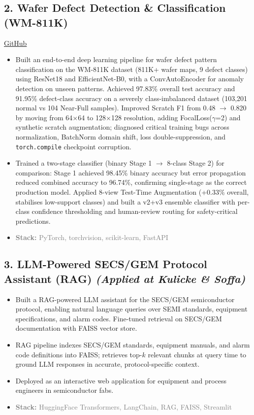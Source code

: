 \documentclass[11pt,a4paper]{article}
\newcommand{\projectstack}[1]{\textcolor{graytext}{\textbf{Stack:} #1}}
\begin{document}
\subsection{2. Wafer Defect Detection \& Classification (WM-811K)}
{\small \href{https://github.com/Shivamckaushik/Visual-inspection-for-Wafer-Defect-Detection-Classification-WM-811K-.git}{GitHub}}
\begin{itemize}[leftmargin=*, nosep, topsep=3pt]
    \item Built an end-to-end deep learning pipeline for wafer defect pattern classification on the WM-811K dataset (811K+ wafer maps, 9 defect classes) using ResNet18 and EfficientNet-B0, with a ConvAutoEncoder for anomaly detection on unseen patterns. Achieved 97.83\% overall test accuracy and 91.95\% defect-class accuracy on a severely class-imbalanced dataset (103,201 normal vs 104 Near-Full samples). Improved Scratch F1 from 0.48 $\rightarrow$ 0.820 by moving from 64$\times$64 to 128$\times$128 resolution, adding FocalLoss($\gamma$=2) and synthetic scratch augmentation; diagnosed critical training bugs across normalization, BatchNorm domain shift, loss double-suppression, and \texttt{torch.compile} checkpoint corruption.
    \item Trained a two-stage classifier (binary Stage 1 $\rightarrow$ 8-class Stage 2) for comparison: Stage 1 achieved 98.45\% binary accuracy but error propagation reduced combined accuracy to 96.74\%, confirming single-stage as the correct production model. Applied 8-view Test-Time Augmentation (+0.33\% overall, stabilises low-support classes) and built a v2+v3 ensemble classifier with per-class confidence thresholding and human-review routing for safety-critical predictions.
    \item \projectstack{PyTorch, torchvision, scikit-learn, FastAPI}
\end{itemize}

\subsection{3. LLM-Powered SECS/GEM Protocol Assistant (RAG) \textnormal{\textit{(Applied at Kulicke \& Soffa)}}}
\begin{itemize}[leftmargin=*, nosep, topsep=3pt]
    \item Built a RAG-powered LLM assistant for the SECS/GEM semiconductor protocol, enabling natural language queries over SEMI standards, equipment specifications, and alarm codes. Fine-tuned retrieval on SECS/GEM documentation with FAISS vector store.
    \item RAG pipeline indexes SECS/GEM standards, equipment manuals, and alarm code definitions into FAISS; retrieves top-$k$ relevant chunks at query time to ground LLM responses in accurate, protocol-specific context.
    \item Deployed as an interactive web application for equipment and process engineers in semiconductor fabs.
    \item \projectstack{HuggingFace Transformers, LangChain, RAG, FAISS, Streamlit}
\end{itemize}
\end{document}
